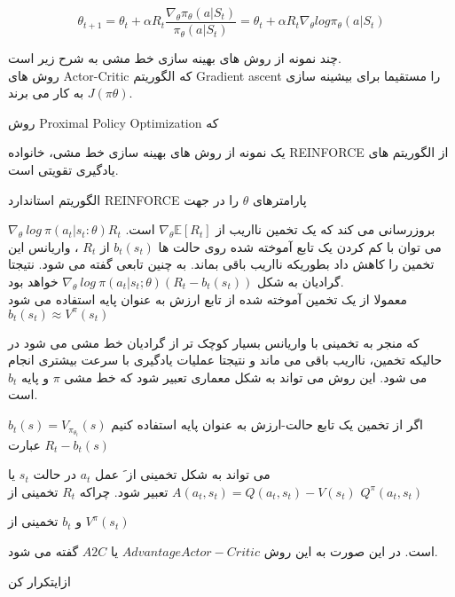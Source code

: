 $$\theta_{t+1} = \theta_t + \alpha R_t \frac{\nabla_\theta \pi_\theta (a|S_t)}{\pi_\theta (a|S_t)} = \theta_t + \alpha R_t \nabla_\theta log \pi_\theta (a|S_t)$$

چند نمونه از روش های بهینه سازی خط مشی به شرح زیر است. \\
روش های Actor-Critic که الگوریتم Gradient ascent را مستقیما برای بیشینه سازی 
$J(\pi\theta)$
به کار می برند.

روش  Proximal Policy Optimization که


یک نمونه از روش های بهینه سازی خط مشی، خانواده REINFORCE از الگوریتم های یادگیری تقویتی است.
\cite{williams1992simple}

الگوریتم استاندارد REINFORCE پارامترهای $\theta$ را در جهت 

$\nabla_\theta \  log  \ \pi (a_t|s_t:\theta)R_t$
بروزرسانی می کند که یک تخمین نااریب از 
$\nabla_\theta \mathbb{E}[R_t]$
است. می توان  با کم کردن یک تابع آموخته شده روی حالت ها 
$b_t(s_t)$
از 
$R_t$
، واریانس این تخمین را کاهش داد بطوریکه نااریب باقی بماند. به چنین تابعی  گفته می شود. نتیجتا گرادیان به شکل
$\nabla_\theta \ log \ \pi(a_t|s_t;\theta) (R_t - b_t(s_t))$
خواهد بود. \\

معمولا از یک تخمین آموخته شده از تابع ارزش به عنوان پایه استفاده می شود
$b_t(s_t) \approx V^\pi (s_t)$

که منجر به تخمینی با واریانس بسیار کوچک تر از گرادیان خط مشی می \nf شود در حالیکه تخمین، نااریب باقی می ماند و نتیجتا عملیات یادگیری با سرعت بیشتری انجام می شود.
این روش می تواند به شکل معماری   تعبیر شود که خط مشی $\pi$  و پایه $b_t$  است. 


 اگر از تخمین یک تابع حالت-ارزش به عنوان پایه استفاده کنیم 
$b_t(s) = V_{\pi_{\theta_t}}(s)$
عبارت 
$R_t - b_t(s)$

می تواند به شکل تخمینی از  َ عمل $a_t$ در حالت $s_t$ یا 
$A(a_t,s_t)=Q(a_t,s_t)-V(s_t)$
تعبیر شود. چراکه $R_t$ تخمینی از 
$Q^\pi (a_t, s_t)$

و $b_t$ تخمینی از 
$V^\pi (s_t)$

است. در این صورت به این روش $Advantage Actor-Critic$ یا $A2C$ گفته می شود.

‌ازای{تکرار کن}

